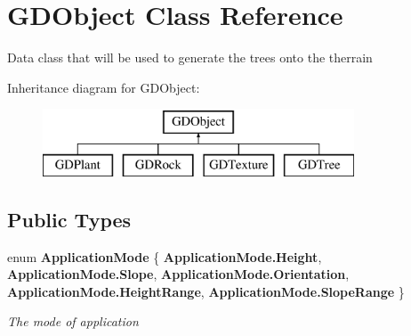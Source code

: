 \section{G\+D\+Object Class Reference}
\label{class_g_d_object}


Data class that will be used to generate the trees onto the therrain  


Inheritance diagram for G\+D\+Object\+:\begin{figure}[H]
\begin{center}
\leavevmode
\includegraphics[height=2.000000cm]{class_g_d_object}
\end{center}
\end{figure}
\subsection*{Public Types}
\begin{DoxyCompactItemize}
\item 
enum \textbf{ Application\+Mode} \{ \newline
\textbf{ Application\+Mode.\+Height}, 
\textbf{ Application\+Mode.\+Slope}, 
\textbf{ Application\+Mode.\+Orientation}, 
\textbf{ Application\+Mode.\+Height\+Range}, 
\newline
\textbf{ Application\+Mode.\+Slope\+Range}
 \}\begin{DoxyCompactList}\small\item\em The mode of application \end{DoxyCompactList}
\end{DoxyCompactItemize}
